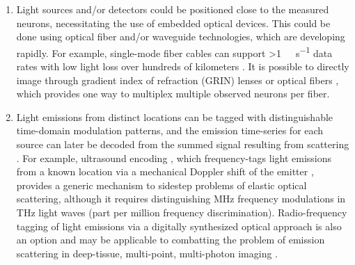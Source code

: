 \begin{enumerate}
When using short optical pulses, scattering can lead to temporal distortions that degrade the peak light intensity at a focal spot. The \SI{<100}{\femto\second} pulse durations used in two-photon microscopy, for example, are comparable to the time it takes light to travel \SI{30}{\micro\meter} in vacuum. Fortunately, wavefront shaping techniques can correct for scattering-induced temporal distortions as well \cite{mccabe2011spatio, katz2011focusing}.
\item Light sources and/or detectors could be positioned close to the measured neurons, necessitating the use of embedded optical devices.
This could be done using optical fiber \cite{mahalati13} and/or waveguide \cite{zorzos10,zorzos12} technologies, which are developing rapidly.
For example, single-mode fiber cables can support \SI{>1}{\tera\byte\per\second} data rates \cite{ono1998key, bozinovic2013terabit} with low light loss over hundreds of kilometers \cite{miya1979ultimate}. It is possible to directly image through gradient index of refraction (GRIN) lenses \cite{murray12} or optical fibers \cite{mahalati13,kang10,flusberg05}, which provides one way to multiplex multiple observed neurons per fiber.
\item Light emissions from distinct locations can be tagged with distinguishable time-domain modulation patterns, and the emission time-series for each source can later be decoded from the summed signal resulting from scattering \cite{wang12, diebold2013digitally, ducros2013encoded, yin2006frequency, wu2006frequency, cheng2011simultaneous}. For example, ultrasound encoding \cite{wang12}, which frequency-tags light emissions from a known location via a mechanical Doppler shift of the emitter \cite{mahan98}, provides a generic mechanism to sidestep problems of elastic optical scattering, although it requires distinguishing MHz frequency modulations in THz light waves (part per million frequency discrimination). Radio-frequency tagging of light emissions via a digitally synthesized optical approach is also an option and may be applicable to combatting the problem of emission scattering in deep-tissue, multi-point, multi-photon imaging \cite{diebold2013digitally}.
\end{enumerate}

